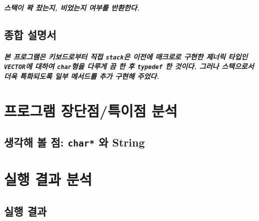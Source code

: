\documentclass[UTF8]{report}
\begin{document}
            \paragraph{%
                \normalfont 스택이 꽉 찼는지, 비었는지 여부를 반환한다.
            }

        \section{종합 설명서}

            \paragraph{%
                \normalfont 본 프로그램은 키보드로부터 직접 \texttt{stack}은 이전에 매크로로 구현한 제너릭 타입인 \texttt{VECTOR}에 대하여 \texttt{char}형을 다루게 끔 한 후 \texttt{typedef} 한 것이다. 그러나 스택으로서 더욱 특화되도록 일부 메서드를 추가 구현해 주었다.
            }

    \chapter{프로그램 장단점/특이점 분석}
            \section{생각해 볼 점: \texttt{char*} 와 String}

    \chapter{실행 결과 분석}
        \section{실행 결과}
\end{document}
